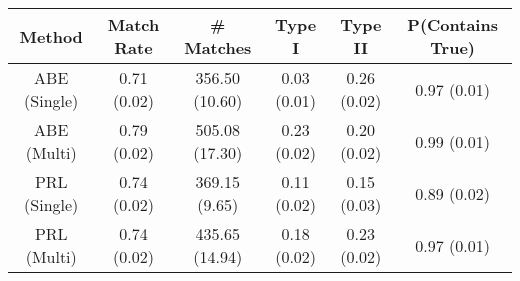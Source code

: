 
\begin{tabular}{cccccc}
\toprule
Method & Match Rate & \# Matches & Type I & Type II & P(Contains True)\\
\midrule
ABE (Single) & 0.71 (0.02) & 356.50 (10.60) & 0.03 (0.01) & 0.26 (0.02) & 0.97 (0.01)\\
ABE (Multi) & 0.79 (0.02) & 505.08 (17.30) & 0.23 (0.02) & 0.20 (0.02) & 0.99 (0.01)\\
PRL (Single) & 0.74 (0.02) & 369.15 (9.65) & 0.11 (0.02) & 0.15 (0.03) & 0.89 (0.02)\\
PRL (Multi) & 0.74 (0.02) & 435.65 (14.94) & 0.18 (0.02) & 0.23 (0.02) & 0.97 (0.01)\\
\bottomrule
\end{tabular}
